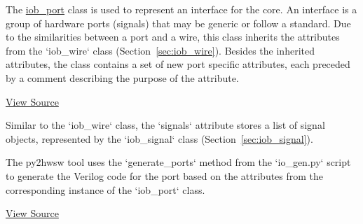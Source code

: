 %

%
%

The \href{https://github.com/IObundle/py2hwsw/blob/main/py2hwsw/scripts/iob_port.py}{iob\_port} class is used to represent an interface for the core.
An interface is a group of hardware ports (signals) that may be generic or follow a standard.
Due to the similarities between a port and a wire, this class inherits the attributes from the `iob\_wire` class (Section~\ref{sec:iob_wire}).
Besides the inherited attributes, the class contains a set of new port specific attributes, each preceded by a comment describing the purpose of the attribute.

\href{https://github.com/IObundle/py2hwsw/blob/main/py2hwsw/scripts/iob_port.py}{View Source}

Similar to the `iob\_wire` class, the `signals` attribute stores a list of signal objects, represented by the `iob\_signal` class  (Section~\ref{sec:iob_signal}).

%
%

The py2hwsw tool uses the `generate\_ports` method from the `io\_gen.py` script to generate the Verilog code for the port based on the attributes from the corresponding instance of the `iob\_port` class.

\href{https://github.com/IObundle/py2hwsw/blob/main/py2hwsw/scripts/io_gen.py}{View Source}
